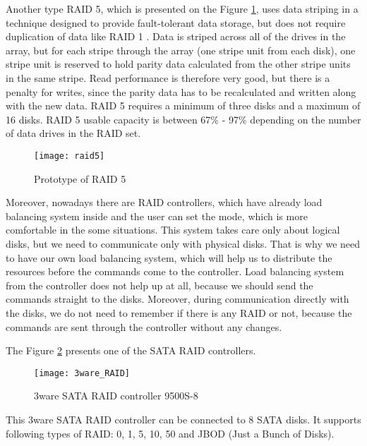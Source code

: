 Another type RAID 5, which is presented on the Figure \ref{fig:raid5}, uses data striping in a technique designed to provide fault-tolerant data storage, but does not require duplication of data like RAID 1 \cite{raid_overview}. Data is striped across all of the drives in the array, but for each stripe through the array (one stripe unit from each disk), one stripe unit is reserved to hold parity data calculated from the other stripe units in the same stripe. Read performance is therefore very good, but there is a penalty for writes, since the parity data has to be recalculated and written along with the new data. RAID 5 requires a minimum of three disks and a maximum of 16 disks. RAID 5 usable capacity is between 67\% - 97\% depending on the number of data drives in the RAID set.
\begin{figure}[h]
\begin{center}
  \texttt{[image: raid5]}
\end{center}
  \caption{Prototype of RAID 5}
  \label{fig:raid5}
\end{figure}
Moreover, nowadays there are RAID controllers, which have already load balancing system inside and the user can set the mode, which is more comfortable in the some situations. This system takes care only about logical disks, but we need to communicate only with physical disks. That is why we need to have our own load balancing system, which will help us to distribute the resources before the commands come to the controller. Load balancing system from the controller does not help up at all, because we should send the commands straight to the disks. Moreover, during communication directly with the disks, we do not need to remember if there is any RAID or not, because the commands are sent through the controller without any changes.  

The Figure \ref{fig:3ware_RAID} presents one of the SATA RAID controllers. 
\begin{figure}[h]
\begin{center}
  \texttt{[image: 3ware\_RAID]}
\end{center}
  \caption{3ware SATA RAID controller 9500S-8}
  \label{fig:3ware_RAID}
\end{figure}
This 3ware SATA RAID controller can be connected to 8 SATA disks. It supports following types of RAID: 0, 1, 5, 10, 50 and JBOD (Just a Bunch of Disks).


\newpage
